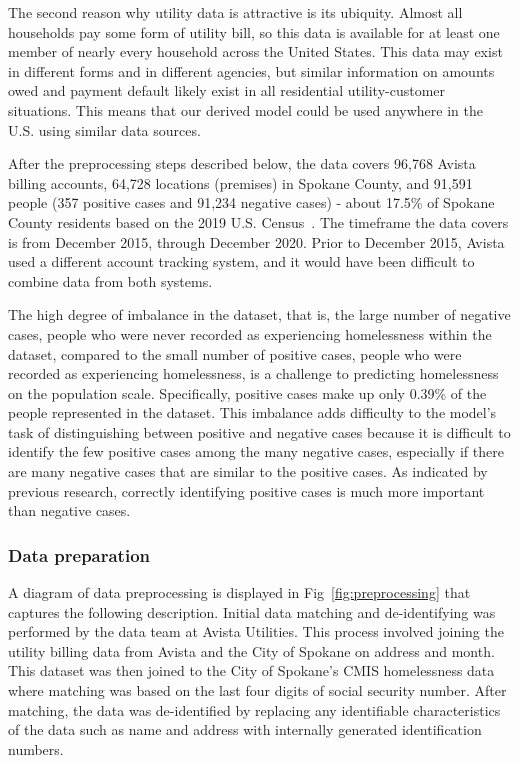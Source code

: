 \documentclass[10pt,letterpaper]{article}
\begin{document}
The second reason why utility data is attractive is its ubiquity. Almost all households pay some form of utility bill, so this data is available for at least one member of nearly every household across the United States. This data may exist in different forms and in different agencies, but similar information on amounts owed and payment default likely exist in all residential utility-customer situations. This means that our derived model could be used anywhere in the U.S. using similar data sources.

After the preprocessing steps described below, the data covers 96,768 Avista billing accounts, 64,728 locations (premises) in Spokane County, and 91,591 people (357 positive cases and 91,234 negative cases) - about 17.5\% of Spokane County residents based on the 2019 U.S. Census~\cite{SpokanePop}. The timeframe the data covers is from December 2015, through December 2020. Prior to December 2015, Avista used a different account tracking system, and it would have been difficult to combine data from both systems. 

The high degree of imbalance in the dataset, that is, the large number of negative cases, people who were never recorded as experiencing homelessness within the dataset, compared to the small number of positive cases, people who were recorded as experiencing homelessness, is a challenge to predicting homelessness on the population scale. Specifically, positive cases make up only 0.39\% of the people represented in the dataset. This imbalance adds difficulty to the model's task of distinguishing between positive and negative cases because it is difficult to identify the few positive cases among the many negative cases, especially if there are many negative cases that are similar to the positive cases. As indicated by previous research, correctly identifying positive cases is much more important than negative cases.

\subsubsection*{Data preparation}
A diagram of data preprocessing is displayed in Fig~\ref{fig:preprocessing} that captures the following description. Initial data matching and de-identifying was performed by the data team at Avista Utilities. This process involved joining the utility billing data from Avista and the City of Spokane on address and month. This dataset was then joined to the City of Spokane's CMIS homelessness data where matching was based on the last four digits of social security number. After matching, the data was de-identified by replacing any identifiable characteristics of the data such as name and address with internally generated identification numbers.
\end{document}

